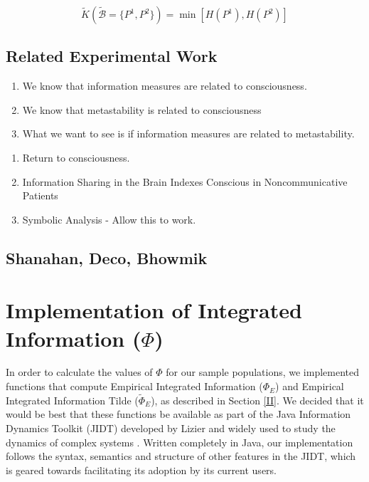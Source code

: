 \documentclass[a4paper,11pt]{article}
\begin{document}
\begin{equation} \label{eq:norm-tilde}
\widetilde{K}(\widetilde{\mathcal{B}} = \lbrace P^1, P^2 \rbrace) = \min[H(P^1), H(P^2)]
\end{equation}


\subsection{Related Experimental Work}
\begin{enumerate}
\item{We know that information measures are related to consciousness.}
\item{We know that metastability is related to consciousness}
\item{What we want to see is if information measures are related to metastability.}
\end{enumerate}

\begin{enumerate}
\item{Return to consciousness.}
\item{Information Sharing in the Brain Indexes Conscious in Noncommunicative Patients}
\item{Symbolic Analysis - Allow this to work.}
\end{enumerate}

\subsection{Shanahan, Deco, Bhowmik}

\clearpage
\section{Implementation of Integrated Information ($\Phi$)}
\label{sec:impl}

In order to calculate the values of $\Phi$ for our sample populations, we implemented functions that compute Empirical Integrated Information ($\Phi_{E}$) and Empirical Integrated Information Tilde ($\widetilde{\Phi}_{E}$), as described in Section \ref{II}. We decided that it would be best that these functions be available as part of the Java Information Dynamics Toolkit (JIDT) developed by Lizier and widely used to study the dynamics of complex systems \cite{Lizier2014}. Written completely in Java, our implementation follows the syntax, semantics and structure of other features in the JIDT, which is geared towards facilitating its adoption by its current users.
\end{document}
